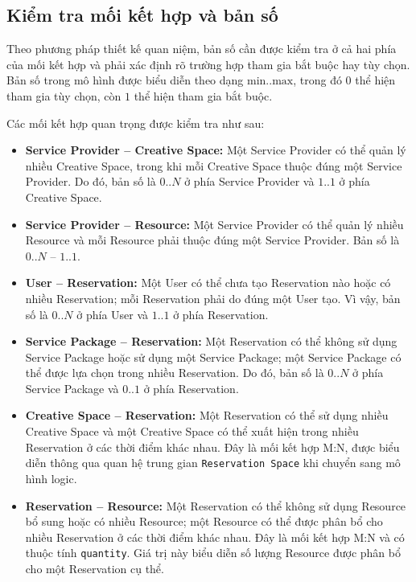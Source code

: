 \subsection{Kiểm tra mối kết hợp và bản số}

Theo phương pháp thiết kế quan niệm, bản số cần được kiểm tra ở cả hai phía của mối kết hợp và phải xác định rõ trường hợp tham gia bắt buộc hay tùy chọn. Bản số trong mô hình được biểu diễn theo dạng $\text{min}..\text{max}$, trong đó $0$ thể hiện tham gia tùy chọn, còn $1$ thể hiện tham gia bắt buộc.

Các mối kết hợp quan trọng được kiểm tra như sau:

\begin{itemize}

\item \textbf{Service Provider -- Creative Space:} Một Service Provider có thể quản lý nhiều Creative Space, trong khi mỗi Creative Space thuộc đúng một Service Provider. Do đó, bản số là $0..N$ ở phía Service Provider và $1..1$ ở phía Creative Space.

\item \textbf{Service Provider -- Resource:} Một Service Provider có thể quản lý nhiều Resource và mỗi Resource phải thuộc đúng một Service Provider. Bản số là $0..N$ -- $1..1$.

\item \textbf{User -- Reservation:} Một User có thể chưa tạo Reservation nào hoặc có nhiều Reservation; mỗi Reservation phải do đúng một User tạo. Vì vậy, bản số là $0..N$ ở phía User và $1..1$ ở phía Reservation.

\item \textbf{Service Package -- Reservation:} Một Reservation có thể không sử dụng Service Package hoặc sử dụng một Service Package; một Service Package có thể được lựa chọn trong nhiều Reservation. Do đó, bản số là $0..N$ ở phía Service Package và $0..1$ ở phía Reservation.

\item \textbf{Creative Space -- Reservation:} Một Reservation có thể sử dụng nhiều Creative Space và một Creative Space có thể xuất hiện trong nhiều Reservation ở các thời điểm khác nhau. Đây là mối kết hợp M:N, được biểu diễn thông qua quan hệ trung gian \texttt{Reservation Space} khi chuyển sang mô hình logic.

\item \textbf{Reservation -- Resource:} Một Reservation có thể không sử dụng Resource bổ sung hoặc có nhiều Resource; một Resource có thể được phân bổ cho nhiều Reservation ở các thời điểm khác nhau. Đây là mối kết hợp M:N và có thuộc tính \texttt{quantity}. Giá trị này biểu diễn số lượng Resource được phân bổ cho một Reservation cụ thể.


\end{itemize}

